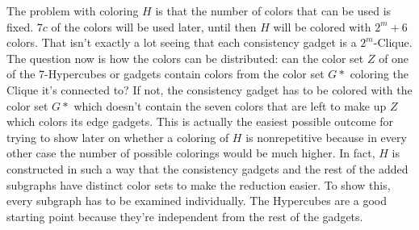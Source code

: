 \documentclass[12pt,a4paper]{article}
\begin{document}
The problem with coloring $H$ is that the number of colors that can be used is fixed. $7c$ of the colors will be used later, until then $H$ will be colored with $2^m+6$ colors. That isn't exactly a lot seeing that each consistency gadget is a $2^m$-Clique. The question now is how the colors can be distributed: can the color set $Z$ of one of the 7-Hypercubes or gadgets contain colors from the color set $G*$ coloring the Clique it's connected to? If not, the consistency gadget has to be colored with the color set $G*$ which doesn't contain the seven colors that are left to make up $Z$ which colors its edge gadgets. This is actually the easiest possible outcome for trying to show later on whether a coloring of $H$ is nonrepetitive because in every other case the number of possible colorings would be much higher. In fact, $H$ is constructed in such a way that the consistency gadgets and the rest of the added subgraphs have distinct color sets to make the reduction easier. To show this, every subgraph has to be examined individually. The Hypercubes are a good starting point because they're independent from the rest of the gadgets. 
\newline
\end{document}
